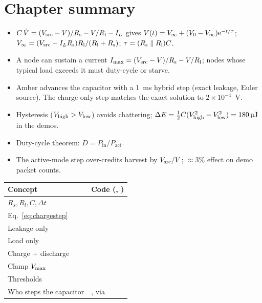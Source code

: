 \section{Chapter summary}
\begin{itemize}
 \item $C\,\dot V=(V_{\mathrm{src}}-V)/R_{\mathrm{s}}-V/R_{\mathrm{l}}-I_L$ gives $V(t)=V_\infty+(V_0-V_\infty)\mathrm{e}^{-t/\tau}$; $V_\infty=(V_{\mathrm{src}}-I_LR_{\mathrm{s}})R_{\mathrm{l}}/(R_{\mathrm{l}}+R_{\mathrm{s}})$; $\tau=(R_{\mathrm{s}}\parallel R_{\mathrm{l}})C$.
 \item A node can sustain a current $I_{\max}=(V_{\mathrm{src}}-V)/R_{\mathrm{s}}-V/R_{\mathrm{l}}$; nodes whose typical load exceeds it must duty-cycle or starve.
 \item Amber advances the capacitor with a 1~ms hybrid step (exact leakage, Euler source). The charge-only step matches the exact solution to $2\times10^{-4}$~V.
 \item Hysteresis ($V_{\mathrm{high}}>V_{\mathrm{low}}$) avoids chattering; $\Delta E=\tfrac12C(V_{\mathrm{high}}^2-V_{\mathrm{low}}^2)=\SI{180}{\micro J}$ in the demos.
 \item Duty-cycle theorem: $D=P_{\mathrm{in}}/P_{\mathrm{act}}$.
 \item The active-mode step over-credits harvest by $V_{\mathrm{src}}/V$; $\approx3\%$ effect on demo packet counts.
\end{itemize}

\begin{codemap}
\small
\begin{tabularx}{\linewidth}{@{}>{\ttfamily}p{5.0cm}X@{}}
\toprule
\normalfont\bfseries Concept & \normalfont\bfseries Code (\file{amber/capacitor.py}, \file{controller.py})\\
\midrule
$R_s,R_l,C,\Delta t$ & \codew{CapacitorParams}\\
Eq.~\eqref{eq:chargestep} & \codew{Capacitor.capacitor_charging}\\
Leakage only & \codew{Capacitor.capacitor_selfdischarge}\\
Load only & \codew{Capacitor.load_discharging}\\
Charge + discharge & \codew{Capacitor.charge_and_discharge}\\
Clamp $V_{\mathrm{max}}$ & \code{voltage_max}\\
Thresholds & \codew{VoltageThresholdsV(high, low)}\\
Who steps the capacitor & \codew{Controller.run}, via \codew{action.interrupt(cause)}\\
\bottomrule
\end{tabularx}
\end{codemap}


